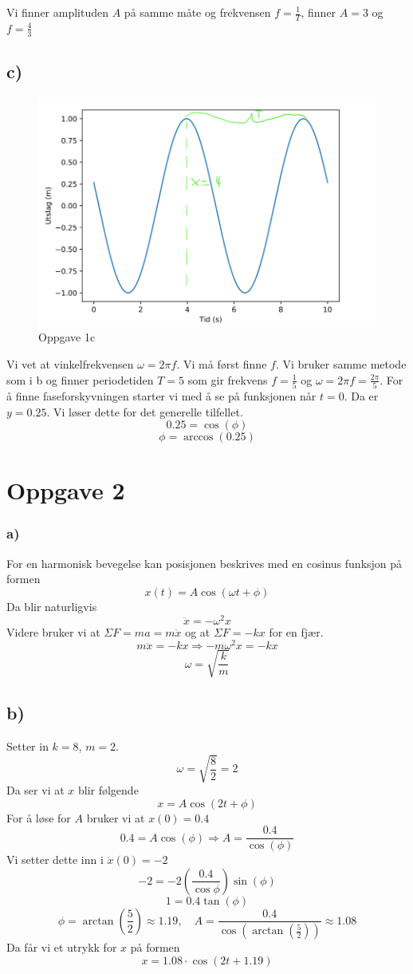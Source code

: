 \documentclass{article}
\begin{document}
Vi finner amplituden $A$ på samme måte og frekvensen $f = \frac{1}{T}$, finner $A = 3$ og $f = \frac{4}{3}$ 

\subsection*{c)}
\begin{figure}[h!]
    \centering
    \includegraphics[scale = .5]{Figures/1.c.png}
    \caption{Oppgave 1c}
    \label{fig: 1c}
  \end{figure}
  
Vi vet at vinkelfrekvensen $ω = 2πf$. Vi må først finne $f$. Vi bruker samme metode som i b og finner periodetiden $T = 5$ som gir frekvens $f = \frac{1}{5}$ og $ω = 2πf = \frac{2π}{5}$. For å finne faseforskyvningen starter vi med å se på funksjonen når $t = 0$. Da er $y = 0.25$. Vi løser dette for det generelle tilfellet. 
\[
0.25 = \cos(ϕ)
\]
\[
 ϕ = \arccos (0.25)
\]

  
\section*{Oppgave 2}
\subsubsection*{a)}
For en harmonisk bevegelse kan posisjonen beskrives med en cosinus funksjon på formen
\[
x (t) = A \cos(ωt + ϕ)
\]
Da blir naturligvis 
\[
\ddot{x} = -ω^{2}x
\]
Videre bruker vi at $ΣF = ma = m \ddot{x}$ og at $ΣF = -kx$ for en fjær. 
\[
m \ddot{x} = -kx ⇒ - mω^{2}x = -kx
\]
\[
ω = \sqrt{\frac{k}{m}}
\]


\subsection*{b)}
Setter in $k = 8$, $m = 2$. 
\[
ω = \sqrt{\frac{8}{2}} = 2
\]
Da ser vi at $x$ blir følgende
\[
x = A \cos(2t + ϕ)
\]
For å løse for $A$ bruker vi at $x(0) = 0.4$
\[
0.4 = A \cos(ϕ) ⇒ A = \frac{0.4}{\cos(ϕ)}
\]
Vi setter dette inn i $\dot{x}(0) = -2$
\[
-2 = -2 \left( \frac{0.4}{\cos ϕ} \right)  \sin(ϕ)
\]
\[
1 = 0.4 \tan(ϕ)
\]
\[
ϕ = \arctan \left( \frac{5}{2} \right)  ≈ 1.19  , \quad A = \frac{0.4}{\cos  \left( \arctan \left( \frac{5}{2} \right)  \right) } ≈ 1.08
\]
Da får vi et utrykk for $x$ på formen
\[
x = 1.08 ⋅  \cos(2t + 1.19)
\]
\end{document}
